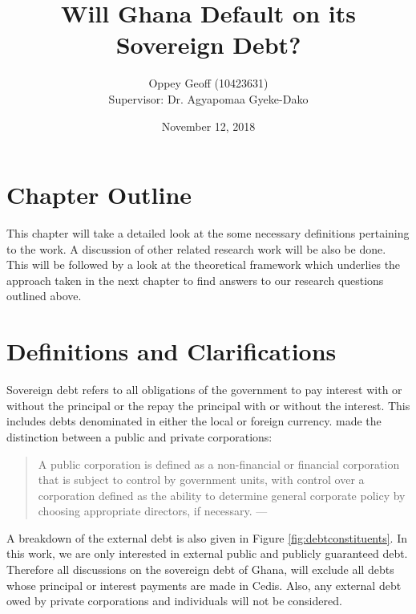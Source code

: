 \documentclass[14pt, a4paper]{article}
\title{Will Ghana Default on its Sovereign Debt?}
\author{Oppey Geoff (10423631) \\ Supervisor: Dr. Agyapomaa Gyeke-Dako}
\date{November 12, 2018}
\begin{document}
	\maketitle
	\clearpage
	\doublespacing	
	
	\section{Chapter Outline}
	This chapter will take a detailed look at the some necessary definitions pertaining to the work. A discussion of other related research work will be also be done. This will be followed by a look at the theoretical framework which underlies the approach taken in the next chapter to find answers to our research questions outlined above.
	
	\section{Definitions and Clarifications}
	Sovereign debt refers to all obligations of the government to pay interest with or without the principal or the repay the principal with or without the interest. This includes debts denominated in either the local or foreign currency.  made the distinction between a public and private corporations: %
	
	\begin{quotation}
		A public corporation is defined as a non-financial or financial corporation that is subject to control by government units, with control over a corporation defined as the ability to determine general corporate policy by choosing appropriate directors, if necessary.
		\hspace{1em plus 1fill}---\cite{EXTERNALDEBT}
	\end{quotation}

	A breakdown of the external debt is also given in Figure \ref{fig:debtconstituents}. In this work, we are only interested in external public and publicly guaranteed debt. Therefore all discussions on the sovereign debt of Ghana, will exclude all debts whose principal or interest payments are made in Cedis. Also, any external debt owed by private corporations and individuals will not be considered.
\end{document}
